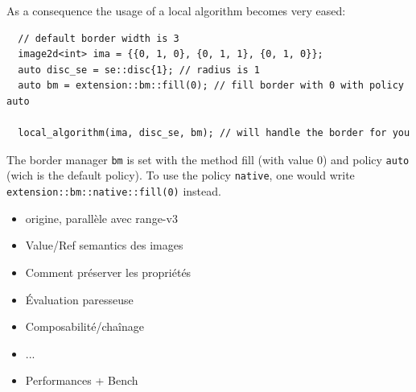 As a consequence the usage of a local algorithm becomes very eased:

\begin{verbatim}
  // default border width is 3
  image2d<int> ima = {{0, 1, 0}, {0, 1, 1}, {0, 1, 0}};
  auto disc_se = se::disc{1}; // radius is 1
  auto bm = extension::bm::fill(0); // fill border with 0 with policy auto

  local_algorithm(ima, disc_se, bm); // will handle the border for you
\end{verbatim}

The border manager \texttt{bm} is set with the method fill (with value 0) and policy \texttt{auto} (wich is the default
policy). To use the policy \texttt{native}, one would write \texttt{extension::bm::native::fill(0)} instead.



\clearpage


\begin{itemize}
  \item origine, parallèle avec range-v3
  \item Value/Ref semantics des images
  \item Comment préserver les propriétés
  \item Évaluation paresseuse
  \item Composabilité/chaînage
  \item ...
  \item Performances + Bench
\end{itemize}